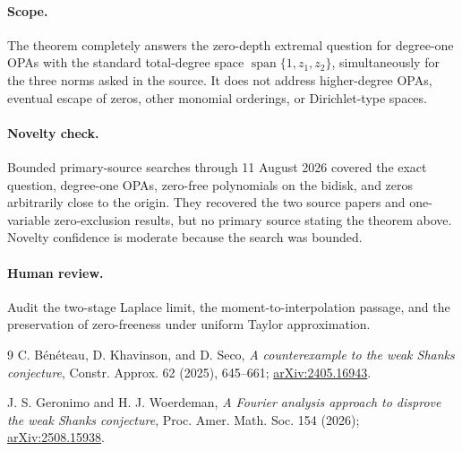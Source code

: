 \documentclass[11pt]{article}
\begin{document}
\paragraph{Scope.}
The theorem completely answers the zero-depth extremal question for
degree-one OPAs with the standard total-degree space
\(\operatorname{span}\{1,z_1,z_2\}\), simultaneously for the three norms
asked in the source. It does not address higher-degree OPAs, eventual escape
of zeros, other monomial orderings, or Dirichlet-type spaces.

\paragraph{Novelty check.}
Bounded primary-source searches through 11 August 2026 covered the exact
question, degree-one OPAs, zero-free polynomials on the bidisk, and zeros
arbitrarily close to the origin. They recovered the two source papers and
one-variable zero-exclusion results, but no primary source stating the
theorem above. Novelty confidence is moderate because the search was
bounded.

\paragraph{Human review.}
Audit the two-stage Laplace limit, the moment-to-interpolation passage, and
the preservation of zero-freeness under uniform Taylor approximation.

\begin{thebibliography}{9}
C. B\'en\'eteau, D. Khavinson, and D. Seco,
\emph{A counterexample to the weak Shanks conjecture},
Constr. Approx. 62 (2025), 645--661;
\href{https://arxiv.org/abs/2405.16943}{arXiv:2405.16943}.

J. S. Geronimo and H. J. Woerdeman,
\emph{A Fourier analysis approach to disprove the weak Shanks conjecture},
Proc. Amer. Math. Soc. 154 (2026);
\href{https://arxiv.org/abs/2508.15938}{arXiv:2508.15938}.
\end{thebibliography}
\end{document}
